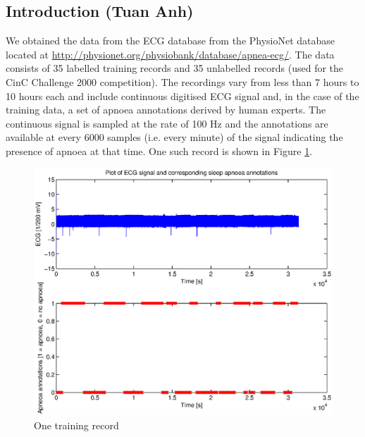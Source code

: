\subsection{Introduction (Tuan Anh)}
	We obtained the data from the ECG database from the PhysioNet database located at \url{http://physionet.org/physiobank/database/apnea-ecg/}. The data consists of 35 labelled training records and 35 unlabelled records (used for the CinC Challenge 2000 competition). The recordings vary from less than 7 hours to 10 hours each and include continuous digitised ECG signal and, in the case of the training data, a set of apnoea annotations derived by human experts. The continuous signal is sampled at the rate of 100 Hz and the annotations are available at every 6000 samples (i.e. every minute) of the signal indicating the presence of apnoea at that time. One such record is shown in Figure \ref{fig:visualiseData}.

	\begin{figure}[ht!]
		\centering
			\includegraphics[width=.5\textwidth]{drawings/visualiseData.eps}
		\caption{One training record}
		\label{fig:visualiseData}
	\end{figure}